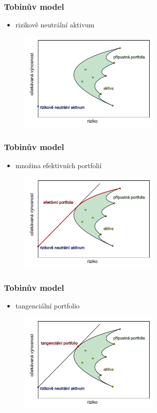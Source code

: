 \documentclass[xcolor=dvipsnames]{beamer}
\theoremstyle{definition} \newtheorem{definice}[veta]{Definice}
\theoremstyle{remark}
\begin{document}
\begin{frame}
  \frametitle{Tobinův model}
  \begin{itemize}
   \item rizikově neutrální aktivum 
  \end{itemize}
  
  \begin{figure}[!htbp]
  \centering 
  \includegraphics[width=7cm]{IMG/graf_6a.pdf}
 \end{figure}
\end{frame}

\begin{frame}
  \frametitle{Tobinův model}
  \begin{itemize}
   \item množina efektivních portfolií
  \end{itemize}  
  
  \begin{figure}[!htbp]
  \centering 
  \includegraphics[width=7cm]{IMG/graf_5b.pdf}
 \end{figure}
\end{frame}

\begin{frame}
  \frametitle{Tobinův model}
  \begin{itemize}
   \item tangenciální portfolio 
  \end{itemize} 
  
  \begin{figure}[!htbp]
  \centering 
  \includegraphics[width=7cm]{IMG/graf_1.pdf}
 \end{figure}
\end{frame}
\end{document}
